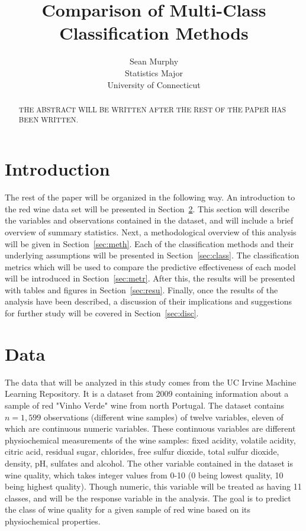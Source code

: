 \documentclass[12pt]{article}
\title{Comparison of Multi-Class Classification Methods}
\author{Sean Murphy\\
  Statistics Major\\
  University of Connecticut
}
\begin{document}
\maketitle

\begin{abstract}
THE ABSTRACT WILL BE WRITTEN AFTER THE REST OF THE PAPER HAS BEEN WRITTEN. 
\end{abstract}

\section{Introduction}
\label{sec:intro}


The rest of the paper will be organized in the following way.  
An introduction to the red wine data set will be presented in 
Section~\ref{sec:data}.  This section will describe the variables 
and observations contained in the dataset, and will include a brief 
overview of summary statistics.  Next, a methodological overview of 
this analysis will be given in Section~\ref{sec:meth}.  Each of the 
classification methods and their underlying assumptions will be 
presented in Section~\ref{sec:class}.  The classification metrics 
which will be used to compare the predictive effectiveness of each 
model will be introduced in Section~\ref{sec:metr}.  After this, 
the results will be presented with tables and figures in 
Section~\ref{sec:resu}.  Finally, once the results of the analysis 
have been described, a discussion of their implications and 
suggestions for further study will be covered in Section~\ref{sec:disc}.


\section{Data}
\label{sec:data}

The data that will be analyzed in this study comes from the UC Irvine Machine 
Learning Repository.  It is a dataset from 2009 containing information about 
a sample of red "Vinho Verde" wine from north Portugal.  The dataset contains 
$n = 1,599$ observations (different wine samples) of twelve variables, eleven 
of which are continuous numeric variables.  These continuous variables are 
different physiochemical measurements of the wine samples: fixed acidity, 
volatile acidity, citric acid, residual sugar, chlorides, free sulfur dioxide, 
total sulfur dioxide, density, pH, sulfates and alcohol.  The other variable 
contained in the dataset is wine quality, which takes integer values from 0-10 
(0 being lowest quality, 10 being highest quality).  Though numeric, this 
variable will be treated as having 11 classes, and will be the response variable 
in the analysis.  The goal is to predict the class of wine quality for a given 
sample of red wine based on its physiochemical properties.  
\end{document}

